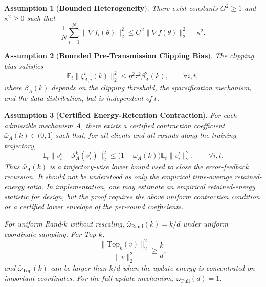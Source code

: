 \documentclass[journal]{IEEEtran}
\newtheorem{assumption}{Assumption}
\begin{document}
\begin{assumption}[\bf Bounded Heterogeneity]
    \label{assum:heterogeneity}
    There exist constants $G^2\ge 1$ and $\kappa^2\ge0$ such that
    \begin{equation}
        \frac1N\sum_{i=1}^{N}\|\nabla f_i(\theta)\|_2^2
        \le G^2\|\nabla f(\theta)\|_2^2+\kappa^2.
    \end{equation}
\end{assumption}

\begin{assumption}[\bf Bounded Pre-Transmission Clipping Bias]
    \label{assum:clipping}
    The clipping bias satisfies
    \begin{equation}
        \mathbb{E}_t\|\xi_{A,i}^t(k)\|_2^2
        \le \eta^2\tau^2\beta_A^2(k),
        \qquad \forall i,t,
    \end{equation}
    where $\beta_A(k)$ depends on the clipping threshold, the sparsification mechanism, and the data distribution, but is independent of $t$.
\end{assumption}

\begin{assumption}[\bf Certified Energy-Retention Contraction]
    \label{assum:contraction}
    For each admissible mechanism $A$, there exists a certified contraction coefficient $\bar{\omega}_A(k)\in(0,1]$ such that, for all clients and all rounds along the training trajectory,
    \begin{equation}
        \mathbb{E}_t\|v_i^t-\mathcal{S}_A^k(v_i^t)\|_2^2
        \le
        \big(1-\bar{\omega}_A(k)\big)\mathbb{E}_t\|v_i^t\|_2^2,
        \qquad \forall i,t.
    \end{equation}
    Thus $\bar{\omega}_A(k)$ is a trajectory-wise lower bound used to close the error-feedback recursion. It should not be understood as only the empirical time-average retained-energy ratio. In implementation, one may estimate an empirical retained-energy statistic for design, but the proof requires the above uniform contraction condition or a certified lower envelope of the per-round coefficients.

    For uniform Rand-$k$ without rescaling, $\bar{\omega}_{\mathrm{Rand}}(k)=k/d$ under uniform coordinate sampling. For Top-$k$,
    \begin{equation}
        \frac{\|\mathrm{Top}_k(v)\|_2^2}{\|v\|_2^2}\ge \frac{k}{d},
    \end{equation}
    and $\bar{\omega}_{\mathrm{Top}}(k)$ can be larger than $k/d$ when the update energy is concentrated on important coordinates. For the full-update mechanism, $\bar{\omega}_{\mathrm{Full}}(d)=1$.
\end{assumption}
\end{document}
